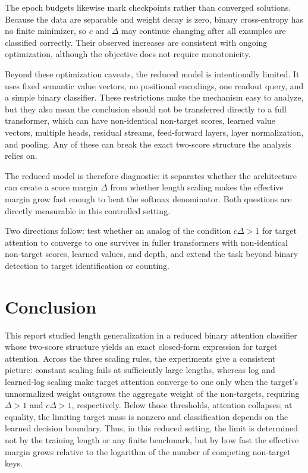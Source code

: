 \documentclass{article}
\begin{document}
The epoch budgets likewise mark checkpoints rather than converged solutions.
Because the data are separable and weight decay is zero, binary cross-entropy
has no finite minimizer, so $c$ and $\Delta$ may continue changing after all
examples are classified correctly. Their observed increases are consistent
with ongoing optimization, although the objective does not require
monotonicity.

Beyond these optimization caveats, the reduced model is intentionally limited.
It uses fixed semantic value
vectors, no positional encodings, one readout query, and a simple binary
classifier. These restrictions make the mechanism easy to analyze, but they
also mean the conclusion should not be transferred directly to a full
transformer, which can have non-identical non-target scores, learned value
vectors, multiple heads, residual streams, feed-forward layers, layer
normalization, and pooling. Any of these can break the exact two-score structure
the analysis relies on.

The reduced model is therefore diagnostic: it separates whether the
architecture can create a score margin $\Delta$ from whether length scaling
makes the effective margin grow fast enough to beat the softmax denominator.
Both questions are directly measurable in this controlled setting.

Two directions follow: test whether an analog of the condition $c\Delta>1$ for
target attention to converge to one survives in fuller transformers with
non-identical non-target scores, learned values, and depth, and extend the task
beyond binary detection to target identification or counting.

\section{Conclusion}
\label{sec:conclusion}

This report studied length generalization in a reduced binary attention
classifier whose two-score structure yields an exact closed-form expression for
target attention. Across the three scaling rules, the experiments give a
consistent picture: constant scaling fails at sufficiently large lengths,
whereas log and learned-log scaling make target attention converge to one only
when the target's unnormalized weight outgrows the aggregate weight of the
non-targets, requiring $\Delta>1$ and $c\Delta>1$, respectively. Below those
thresholds, attention collapses; at equality, the limiting target mass is
nonzero and classification depends on the learned decision boundary. Thus, in
this reduced setting, the limit is determined not by the training length or any
finite benchmark, but by how fast the effective margin grows relative to the
logarithm of the number of competing non-target keys.
\end{document}
